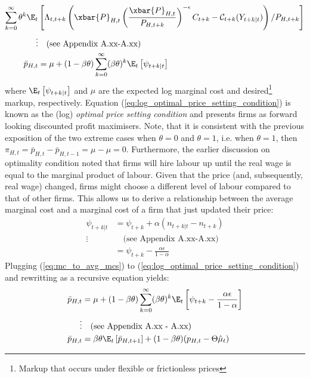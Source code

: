 \begin{align}
    \sum_{k=0}^{\infty} \theta^k \E_t &\left[\Lambda_{t,t+k} \left( \xbar{P}_{H,t} \left(\frac{\xbar{P}_{H,t}}{P_{H,t+k}}\right)^{-\epsilon} C_{t+k} - \mathcal{C}_{t+k}(Y_{t+k|t})\right) / P_{H,t+k} \right] \\
    \vdots & \quad \text{(see Appendix A.xx-A.xx)} \nonumber \\
    \bar{p}_{H,t} &= \mu + (1-\beta \theta) \sum_{k=0}^{\infty} (\beta \theta)^{k} \E_t \left[ \psi_{t+k|t} \right] \label{eq:log_optimal_price_setting_condition}
\end{align}
where $\E_t \left[ \psi_{t+k|t} \right]$ and $\mu$ are the expected log marginal cost and desired\footnote{Markup that occurs under flexible or frictionless prices} markup, respectively. Equation (\ref{eq:log_optimal_price_setting_condition}) is known as the (log) \textit{optimal price setting condition} and presents firms as forward looking discounted profit maximisers. Note, that it is consistent with the previous exposition of the two extreme cases when $\theta = 0$ and $\theta = 1$, i.e. when $\theta = 1$, then $\pi_{H,t} = \bar{p}_{H,t} - \bar{p}_{H,t-1} = \mu - \mu = 0$. Furthermore, the earlier discussion on optimality condition noted that firms will hire labour up until the real wage is equal to the marginal product of labour. Given that the price (and, subsequently, real wage) changed, firms might choose a different level of labour compared to that of other firms. This allows us to derive a relationship between the average marginal cost and a marginal cost of a firm that just updated their price:
\begin{align}
     \psi_{t+k|t} &=  \psi_{t+k} + \alpha(n_{t+k|t} - n_{t+k}) \\
     \vdots & \quad \text{(see Appendix A.xx-A.xx)} \nonumber \\
     &=\psi_{t+k} - \frac{\alpha \epsilon}{1-\alpha} \label{eq:mc_to_avg_mcs}
\end{align}
Plugging (\ref{eq:mc_to_avg_mcs}) to (\ref{eq:log_optimal_price_setting_condition}) and rewritting as a recursive equation yields:
\begin{align}
    \bar{p}_{H,t} &= \mu + (1-\beta \theta) \sum_{k=0}^{\infty} (\beta \theta)^{k} \E_t \left[ \psi_{t+k} - \frac{\alpha \epsilon}{1-\alpha} \right]\\
    \vdots & \quad \text{(see Appendix A.xx - A.xx)} \nonumber \\
    \bar{p}_{H,t} &= \beta \theta \E_t \left[ \bar{p}_{H,t+1} \right] + (1-\beta \theta)(p_{H,t} - \Theta \hat{\mu}_t) \label{eq:dynamic_price_recursive}
\end{align}
